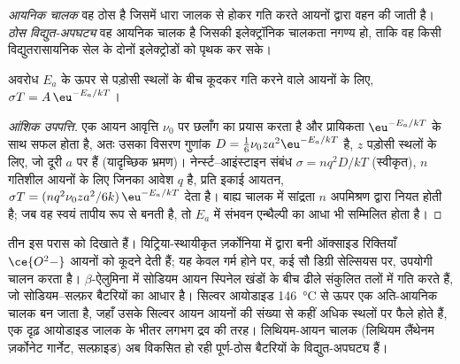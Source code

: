 \begin{definition}[आयनिक चालक]\label{def:b3:solid-state:ionic-conductor}
\emph{आयनिक चालक} वह ठोस है जिसमें धारा
जालक से होकर गति करते आयनों द्वारा वहन की जाती है। \emph{ठोस
विद्युत-अपघट्य} वह आयनिक चालक है जिसकी इलेक्ट्रॉनिक
चालकता नगण्य हो, ताकि वह किसी विद्युतरासायनिक सेल के दोनों इलेक्ट्रोडों को
पृथक कर सके।
\end{definition}

\begin{proposition}[आयनिक चालन का आरेनियस नियम]\label{prop:b3:solid-state:ionic-arrhenius}
अवरोध $E_a$ के ऊपर से पड़ोसी स्थलों के बीच कूदकर गति करने वाले आयनों के लिए,
$\sigma T = A\,\eu^{-E_a/kT}$।
\end{proposition}

\begin{proof}[आंशिक उपपत्ति]
एक आयन आवृत्ति $\nu_0$ पर छलाँग का प्रयास करता है और प्रायिकता $\eu^{-E_a/kT}$ के साथ सफल होता है,
अतः उसका विसरण गुणांक $D = \tfrac16\nu_0 z a^2\eu^{-E_a/kT}$ है, $z$ पड़ोसी स्थलों के लिए, जो
दूरी $a$ पर हैं (यादृच्छिक भ्रमण)। नेर्न्स्ट--आइंस्टाइन संबंध $\sigma = nq^2D/kT$ (स्वीकृत), $n$
गतिशील आयनों के लिए जिनका आवेश $q$ है, प्रति इकाई आयतन, $\sigma T = (nq^2\nu_0za^2/6k)\,\eu^{-E_a/kT}$ देता है।
बाह्य चालक में सांद्रता $n$ अपमिश्रण द्वारा नियत होती है; जब वह
स्वयं तापीय रूप से बनती है, तो $E_a$ में संभवन एन्थैल्पी का आधा भी सम्मिलित होता है।
\end{proof}

तीन  इस परास को दिखाते हैं। यिट्रिया-स्थायीकृत ज़र्कोनिया में
 द्वारा बनी ऑक्साइड रिक्तियाँ $\ce{O^2-}$ आयनों को कूदने देती हैं; यह केवल गर्म होने पर,
कई सौ डिग्री सेल्सियस पर, उपयोगी चालन करता है। $\beta$-ऐलुमिना में सोडियम आयन
स्पिनेल खंडों के बीच ढीले संकुलित तलों में गति करते हैं, जो सोडियम--सल्फ़र
बैटरियों का आधार है। सिल्वर आयोडाइड \qty{146}{\celsius} से ऊपर एक अति-आयनिक चालक बन जाता है,
जहाँ उसके सिल्वर आयन आयनों की संख्या से कहीं अधिक स्थलों पर फैले होते हैं,
एक दृढ़ आयोडाइड जालक के भीतर लगभग द्रव की तरह। लिथियम-आयन चालक
(लिथियम लैंथेनम ज़र्कोनेट गार्नेट, सल्फ़ाइड) अब विकसित हो रही
पूर्ण-ठोस बैटरियों के विद्युत-अपघट्य हैं।

